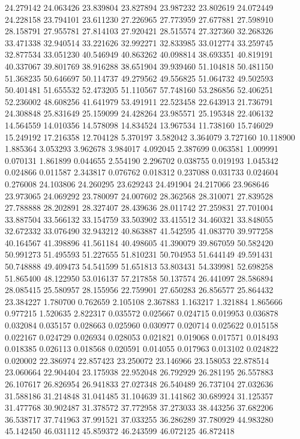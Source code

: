 24.279142
24.063426
23.839804
23.827894
23.987232
23.802619
24.072449
24.228158
23.794101
23.611230
27.226965
27.773959
27.677881
27.598910
28.158791
27.955781
27.814103
27.920421
28.515574
27.327360
32.268326
33.471338
32.940514
33.221626
32.992271
32.833985
33.012774
33.259745
32.877534
33.051230
40.546949
40.863262
40.098814
38.693351
40.819191
40.337067
39.801769
38.916288
38.651904
39.939460
51.104818
50.481150
51.368235
50.646697
50.114737
49.279562
49.556825
51.064732
49.502593
50.401481
51.655532
52.473205
51.110567
57.748160
53.286856
52.406251
52.236002
48.608256
41.641979
53.491911
22.523458
22.643913
21.736791
24.308848
25.831649
25.159099
24.428264
23.985571
25.195348
22.406132
14.564559
14.010356
14.578098
14.834524
13.967534
11.738160
15.746029
15.249192
17.216358
12.704128
5.370197
3.582042
3.364079
3.727160
10.118900
1.885364
3.053293
3.962678
3.984017
4.092045
2.387699
0.063581
1.009991
0.070131
1.861899
0.044655
2.554190
2.296702
0.038755
0.019193
1.045342
0.024866
0.011587
2.343817
0.076762
0.018312
0.237088
0.031733
0.024604
0.276008
24.103806
24.260295
23.629243
24.491904
24.217066
23.968646
23.973065
24.069292
23.780097
24.007602
28.362568
28.310071
27.839528
27.788888
28.202891
28.327407
28.439636
28.011742
27.259831
27.701004
33.887504
33.566132
33.154759
33.503902
33.415512
34.460321
33.848055
32.672332
33.076490
32.943212
40.863887
41.542595
41.083770
39.977258
40.164567
41.398896
41.561184
40.498605
41.390079
39.867059
50.582420
50.991273
51.495593
51.227655
51.810231
50.704953
51.644149
49.591431
50.748888
49.409473
54.541599
51.651813
53.803431
54.339981
52.698258
51.865400
48.122950
53.016137
57.217858
50.137574
26.441097
28.586894
28.085415
25.580957
28.155956
22.759901
27.650283
26.856577
25.864432
23.384227
1.780700
0.762659
2.105108
2.367883
1.163217
1.321884
1.865666
0.977215
1.520635
2.822317
0.035572
0.025667
0.024715
0.019953
0.036878
0.032084
0.035157
0.028663
0.025960
0.030977
0.020714
0.025622
0.015158
0.022167
0.024729
0.026934
0.028053
0.021821
0.019068
0.017571
0.018493
0.018385
0.026113
0.018568
0.020591
0.014055
0.017963
0.013102
0.024822
0.020002
22.386974
22.857423
23.250072
23.146966
23.158053
22.878514
23.060664
22.904404
23.175938
22.952048
26.792929
26.281195
26.557883
26.107617
26.826954
26.941833
27.027348
26.540489
26.737104
27.032636
31.588186
31.214848
31.041485
31.104639
31.141862
30.689924
31.125357
31.477768
30.902487
31.378572
37.772958
37.273033
38.443256
37.682206
36.538717
37.741963
37.991521
37.033255
36.286289
37.780929
44.983280
45.142450
46.031112
45.859372
46.243599
46.072125
46.872418
